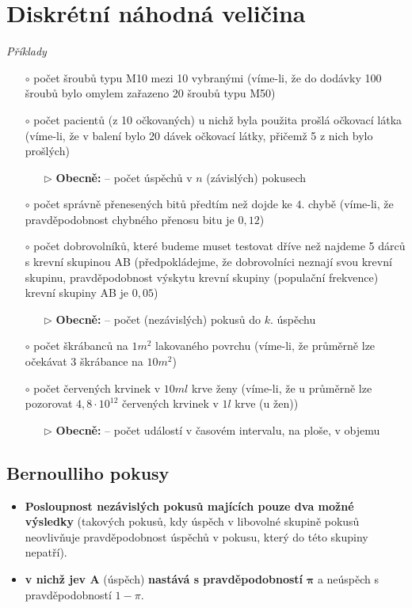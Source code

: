 \section{Diskrétní náhodná veličina}
\textit{Příklady}
\begin{itemize}
    \item[$\circ$] počet šroubů typu M10 mezi 10 vybranými (víme-li, že do dodávky 100 šroubů bylo omylem zařazeno 20 šroubů typu M50)
    \item[$\circ$] počet pacientů (z 10 očkovaných) u nichž byla použita prošlá očkovací látka (víme-li, že v balení bylo 20 dávek očkovací látky, přičemž 5 z nich bylo prošlých)

          \begin{itemize}
              \item[$\rhd$] \textbf{Obecně:} -- počet úspěchů v $n$ (závislých) pokusech
          \end{itemize}
    \item[$\circ$] počet správně přenesených bitů předtím než dojde ke $4.$ chybě (víme-li, že pravděpodobnost chybného přenosu bitu je $0,12$)
    \item[$\circ$] počet dobrovolníků, které budeme muset testovat dříve než najdeme 5 dárců s krevní skupinou AB (předpokládejme, že dobrovolníci neznají svou krevní skupinu, pravděpodobnost výskytu krevní skupiny (populační frekvence) krevní skupiny AB je $0,05$)
          \begin{itemize}
              \item[$\rhd$] \textbf{Obecně:} -- počet (nezávislých) pokusů do $k.$ úspěchu
          \end{itemize}
    \item[$\circ$] počet škrábanců na $1 m^2$ lakovaného povrchu (víme-li, že průměrně lze očekávat 3 škrábance na $10 m^2$)
    \item[$\circ$] počet červených krvinek v $10 ml$ krve ženy (víme-li, že u průměrně lze pozorovat $4,8 \cdot 10^{12}$ červených krvinek v $1l$ krve (u žen))
          \begin{itemize}
              \item[$\rhd$] \textbf{Obecně:} -- počet událostí v časovém intervalu, na ploše, v objemu
          \end{itemize}
\end{itemize}
\subsection{Bernoulliho pokusy}
\begin{itemize}
    \item \textbf{Posloupnost nezávislých pokusů majících pouze dva možné výsledky} (takových pokusů, kdy úspěch v libovolné skupině pokusů neovlivňuje pravděpodobnost úspěchů v pokusu, který do této skupiny nepatří).
    \item \textbf{v nichž jev A} (úspěch) \textbf{nastává s pravděpodobností } $\mathbf{\pi}$ a neúspěch s pravděpodobností $1 - \pi$.
\end{itemize}

